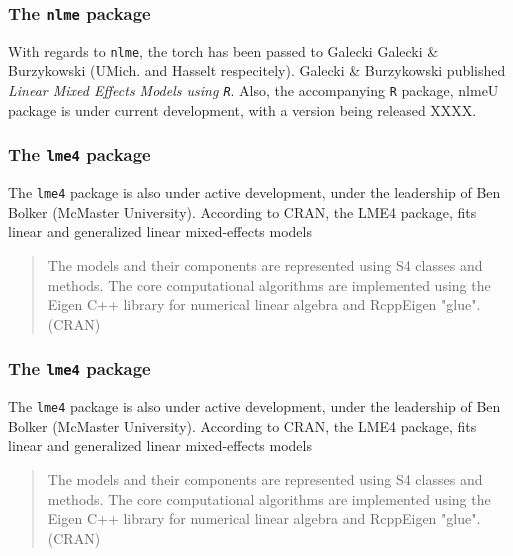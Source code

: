 \documentclass[12pt, a4paper]{article}
\begin{document}
\subsubsection*{The \texttt{nlme} package}

With regards to \texttt{nlme}, the torch has been passed to Galecki Galecki \& Burzykowski (UMich. and Hasselt respecitely).  Galecki \& Burzykowski published \textit{Linear Mixed Effects Models using \texttt{R}}. 
Also, the accompanying \texttt{R} package, nlmeU package is under current development, with a version being released XXXX.


\subsubsection*{The \texttt{lme4} package}

The \texttt{lme4} package is also under active development, under the leadership of Ben Bolker (McMaster University). According to CRAN, the LME4 package, fits linear and generalized linear mixed-effects models

\begin{quote}
	The models and their components are represented using S4 classes and methods. The core computational algorithms are implemented using the Eigen C++ library for numerical linear algebra and RcppEigen "glue".
	(CRAN)
\end{quote}

\subsubsection*{The \texttt{lme4} package}

The \texttt{lme4} package is also under active development, under the leadership of Ben Bolker (McMaster University). According to CRAN, the LME4 package, fits linear and generalized linear mixed-effects models

\begin{quote}
	The models and their components are represented using S4 classes and methods. The core computational algorithms are implemented using the Eigen C++ library for numerical linear algebra and RcppEigen "glue".
	(CRAN)
\end{quote}

\end{document}
